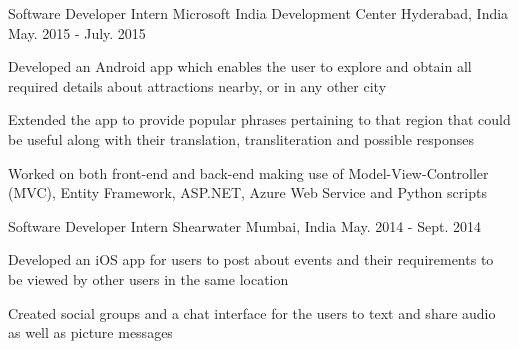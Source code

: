 \begin{cventries}
  \cventry
    {Software Developer Intern} %
    {Microsoft India Development Center} %
    {Hyderabad, India} %
    {May. 2015 - July. 2015} %
    {
      \begin{cvitems} %
        \item {Developed an Android app which enables the user to explore and obtain all required details about attractions nearby, or in any other city  }
		\item {Extended the app to provide popular phrases pertaining to that region that could be useful along with their translation, transliteration and possible responses}
		\item {Worked on both front-end and back-end making use of Model-View-Controller (MVC), Entity Framework, ASP.NET, Azure Web Service and Python scripts}
      \end{cvitems}
    }
	\cventry
	{Software Developer Intern} %
	{Shearwater} %
	{Mumbai, India} %
	{May. 2014 - Sept. 2014} %
	{
		\begin{cvitems} %
			\item {Developed an iOS app for users to post about events and their requirements to be viewed by other users in the same location}
			\item {Created social groups and a chat interface for the users to text and share audio as well as picture messages}
		\end{cvitems}
	}
  
\end{cventries}
